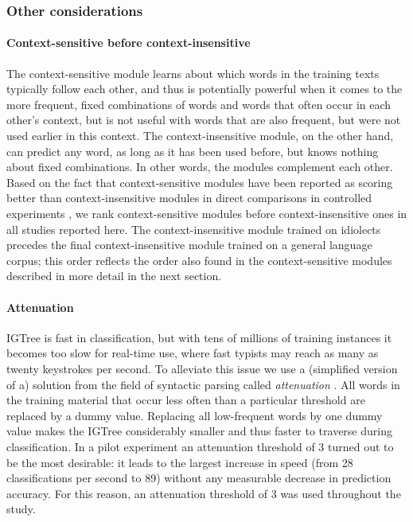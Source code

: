 \documentclass[12pt]{article}
\begin{document}
\subsubsection{Other considerations}

\paragraph{Context-sensitive before context-insensitive}

The context-sensitive module learns about which words in the training texts typically follow each other, and thus is potentially powerful when it comes to the more frequent, fixed combinations of words and words that often occur in each other's context, but is not useful with words that are also frequent, but were not used earlier in this context. The context-insensitive module, on the other hand, can predict any word, as long as it has been used before, but knows nothing about fixed combinations. In other words, the modules complement each other. Based on the fact that context-sensitive modules have been reported as scoring better than context-insensitive modules in direct comparisons in controlled experiments \cite{Lesher+99}, we rank context-sensitive modules before context-insensitive ones in all studies reported here. The context-insensitive module trained on idiolects precedes the final context-insensitive module trained on a general language corpus; this order reflects the order also found in the context-sensitive modules described in more detail in the next section.

\paragraph{Attenuation}

IGTree is fast in classification, but with tens of millions of training instances it becomes too slow for real-time use, where fast typists may reach as many as twenty keystrokes per second. To alleviate this issue we  use a (simplified version of a) solution from the field of syntactic parsing called \emph{attenuation} \cite{eisner96}. All words in the training material that occur less often than a particular threshold are replaced by a dummy value. Replacing all low-frequent words by one dummy value makes the IGTree considerably smaller and thus faster to traverse during classification. In a pilot experiment an attenuation threshold of 3 turned out to be the most desirable: it leads to the largest increase in speed (from 28 classifications per second to 89) without any measurable decrease in prediction accuracy. For this reason, an attenuation threshold of 3 was used throughout the study.
\end{document}
